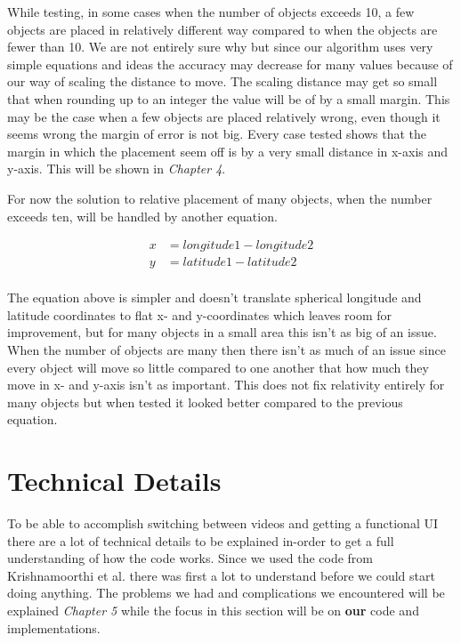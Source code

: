 While testing, in some cases when the number of objects exceeds 10, a few objects are placed in relatively different way compared to when the objects are fewer than 10. We are not entirely sure why but since our algorithm uses very simple equations and ideas the accuracy may decrease for many values because of our way of scaling the distance to move. The scaling distance may get so small that when rounding up to an integer the value will be of by a small margin. This may be the case when a few objects are placed relatively wrong, even though it seems wrong the margin of error is not big. Every case tested shows that the margin in which the placement seem off is by a very small distance in x-axis and y-axis. This will be shown in \textit{Chapter 4}.


For now the solution to relative placement of many objects, when the number exceeds ten, will be handled by another equation. 

\begin{align*}
x &= longitude1-longitude2  \\
y &= latitude1-latitude2 \\
\end{align*}

The equation above is simpler and doesn't translate spherical longitude and latitude coordinates to flat x- and y-coordinates which leaves room for improvement, but for many objects in a small area this isn't as big of an issue. When the number of objects are many then there isn't as much of an issue since every object will move so little compared to one another that how much they move in x- and y-axis isn't as important. This does not fix relativity entirely for many objects but when tested it looked better compared to the previous equation. 

\section{Technical Details}
\label{sec:technicaldetails}

To be able to accomplish switching between videos and getting a functional UI there are a lot of technical details to be explained in-order to get a full understanding of how the code works. Since we used the code from Krishnamoorthi et al. \cite{qualbranch} there was first a lot to understand before we could start doing anything. The problems we had and complications we encountered will be explained \textit{Chapter 5} while the focus in this section will be on \textbf{our} code and implementations. 

